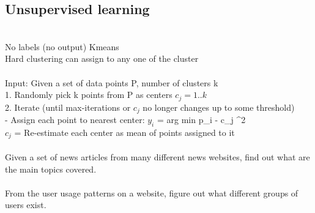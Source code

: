 \documentclass[11pt]{article}
\begin{document}
\subsection*{Unsupervised learning}\\
No labels (no output)
Kmeans 
\\
Hard clustering can assign to any one of the cluster\\
\\
Input: Given a set of data points P, number of clusters k
\\1. Randomly pick k points from P as centers $c_{j} = 1.. k$
 \\2.
Iterate (until max-iterations or $c_{j}$ no longer changes up to some threshold) \\
- Assign each point to nearest center: $y_{i}$ = arg min {\parallel p_{i} - c_{j} \parallel}^{2}\)
\\
$c_{j}$ =  Re-estimate each center as mean of points assigned to it
\\\\
Given a set of news articles from many different news websites, find out what are the main topics covered.
\\\\
From the user usage patterns on a website, figure out what different groups of users exist.
\\\\
\end{document}
